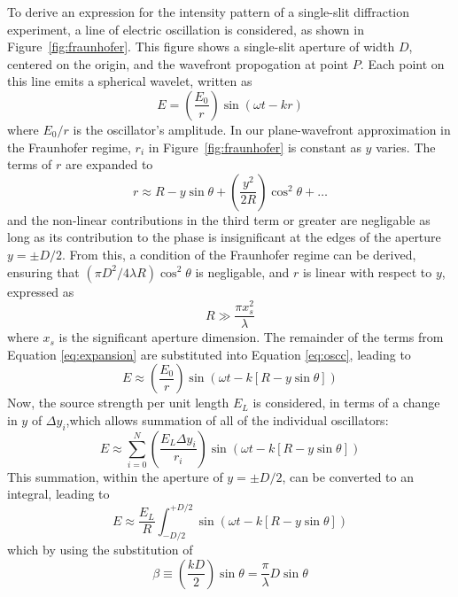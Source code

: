 \documentclass[a4paper]{article}
\begin{document}
To derive an expression for the intensity pattern of a single-slit diffraction experiment, a line of electric oscillation is considered, as shown in Figure~\ref{fig:fraunhofer}. This figure shows a single-slit aperture of width $D$, centered on the origin, and the wavefront propogation at point $P$. Each point on this line emits a spherical wavelet, written as
\begin{equation} \label{eq:oscc}
E=\left(\frac{E_0}r\right)\sin(\omega t-kr)
\end{equation}
where $E_0/r$ is the oscillator's amplitude. In our plane-wavefront approximation in the Fraunhofer regime, $r_i$ in Figure~\ref{fig:fraunhofer} is constant as $y$ varies. The terms of $r$ are expanded to 
\begin{equation} \label{eq:expansion}
  r\approx R-y\sin\theta+\left(\frac{y^2}{2R}\right)\cos^2\theta+\ldots 
\end{equation}
and the non-linear contributions in the third term or greater are negligable as long as its contribution to the phase is insignificant at the edges of the aperture $y=\pm D/2$. From this, a condition of the Fraunhofer regime can be derived, ensuring that $(\pi D^2/4\lambda R)\cos^2\theta$ is negligable, and $r$ is linear with respect to $y$, expressed as
\begin{equation}
  R\gg \frac{\pi x_s^2}\lambda
\end{equation}
where $x_s$ is the significant aperture dimension. The remainder of the terms from Equation \ref{eq:expansion} are substituted into Equation \ref{eq:oscc}, leading to
\begin{equation}
E\approx\left(\frac{E_0}r\right)\sin(\omega t-k[R-y\sin\theta])
\end{equation}
Now, the source strength per unit length $E_L$ is considered, in terms of a change in $y$ of $\Delta y_i$,which allows summation of all of the individual oscillators:
\begin{equation}
E\approx\sum^N_{i=0}\left(\frac{E_L\Delta y_i}{r_i}\right)\sin(\omega t-k[R-y\sin\theta])
\end{equation}
This summation, within the aperture of $y=\pm D/2$, can be converted to an integral, leading to
\begin{equation}
E\approx\frac{E_L}R\int^{+D/2}_{-D/2}\sin(\omega t-k[R-y\sin\theta])
\end{equation}
which by using the substitution of 
\begin{equation} \label{eq:sub}
  \beta\equiv\left(\frac{kD}2\right)\sin\theta =\frac\pi\lambda D\sin\theta
\end{equation}
\end{document}
